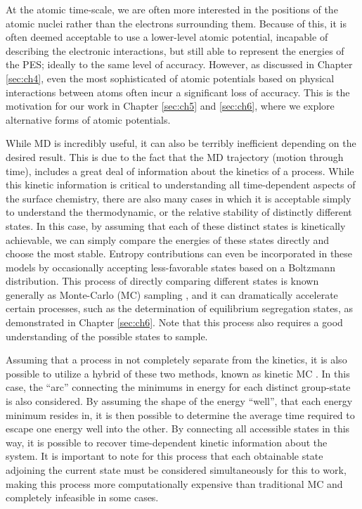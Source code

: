 \documentclass[12pt]{cmuthesis}
\begin{document}
At the atomic time-scale, we are often more interested in the positions of the atomic nuclei rather than the electrons surrounding them. Because of this, it is often deemed acceptable to use a lower-level atomic potential, incapable of describing the electronic interactions, but still able to represent the energies of the PES; ideally to the same level of accuracy. However, as discussed in Chapter \ref{sec:ch4}, even the most sophisticated of atomic potentials based on physical interactions between atoms often incur a significant loss of accuracy. This is the motivation for our work in Chapter \ref{sec:ch5} and \ref{sec:ch6}, where we explore alternative forms of atomic potentials.

While MD is incredibly useful, it can also be terribly inefficient depending on the desired result. This is due to the fact that the MD trajectory (motion through time), includes a great deal of information about the kinetics of a process. While this kinetic information is critical to understanding all time-dependent aspects of the surface chemistry, there are also many cases in which it is acceptable simply to understand the thermodynamic, or the relative stability of distinctly different states. In this case, by assuming that each of these distinct states is kinetically achievable, we can simply compare the energies of these states directly and choose the most stable. Entropy contributions can even be incorporated in these models by occasionally accepting less-favorable states based on a Boltzmann distribution. This process of directly comparing different states is known generally as Monte-Carlo (MC) sampling \cite{mooney-1997-monte}, and it can dramatically accelerate certain processes, such as the determination of equilibrium segregation states, as demonstrated in Chapter \ref{sec:ch6}. Note that this process also requires a good understanding of the possible states to sample.

Assuming that a process in not completely separate from the kinetics, it is also possible to utilize a hybrid of these two methods, known as kinetic MC \cite{binder-1986-introd}. In this case, the ``arc'' connecting the minimums in energy for each distinct group-state is also considered. By assuming the shape of the energy ``well'', that each energy minimum resides in, it is then possible to determine the average time required to escape one energy well into the other. By connecting all accessible states in this way, it is possible to recover time-dependent kinetic information about the system. It is important to note for this process that each obtainable state adjoining the current state must be considered simultaneously for this to work, making this process more computationally expensive than traditional MC and completely infeasible in some cases.
\end{document}
